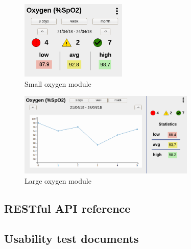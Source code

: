 \begin{figure}[!htb]
    \centering
    \includegraphics[width=0.45\textwidth]{chapters/3_design/mockups/oxygen_small}
    \caption{Small oxygen module}\label{fig:oxygen_small}
\end{figure}

\begin{figure}[!htb]
    \centering
    \includegraphics[width=0.75\textwidth]{chapters/3_design/mockups/oxygen_large}
    \caption{Large oxygen module}\label{fig:oxygen_large}
\end{figure}

\subsection{RESTful API reference}

\subsection{Usability test documents}